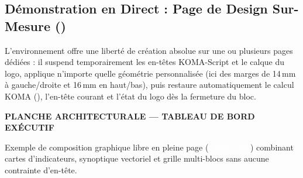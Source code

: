 \begin{pageDesign}[left=1.4cm, right=1.4cm, top=1.6cm, bottom=1.6cm]

\section{Démonstration en Direct : Page de Design Sur-Mesure ()}
\label{sec:demo-page-design}

\noindent
L'environnement  offre une liberté de création absolue sur une ou plusieurs pages dédiées :
il suspend temporairement les en-têtes KOMA-Script et le calque du logo, applique n'importe quelle géométrie personnalisée (ici des marges de 14\,mm à gauche/droite et 16\,mm en haut/bas), puis restaure automatiquement le calcul KOMA (), l'en-tête courant et l'état du logo dès la fermeture du bloc.

\vspace{3mm}

\begin{tcolorbox}[
  enhanced,
  colback=ThesisPrimary,
  colframe=ThesisPrimary,
  arc=4pt,
  boxrule=0pt,
  left=12pt, right=12pt, top=10pt, bottom=10pt,
  borderline south={2.5pt}{0pt}{ThesisAccent}
]
  \sffamily
  {\Large\bfseries\color{white}PLANCHE ARCHITECTURALE --- TABLEAU DE BORD EXÉCUTIF}\par\vspace{1.5mm}
  {\small\color{ThesisBackground!90}Exemple de composition graphique libre en pleine page (\texttt{\textcolor{white}{pageDesign}}) combinant cartes d'indicateurs, synoptique vectoriel et grille multi-blocs sans aucune contrainte d'en-tête.}
\end{tcolorbox}

\vspace{2mm}


\end{pageDesign}
